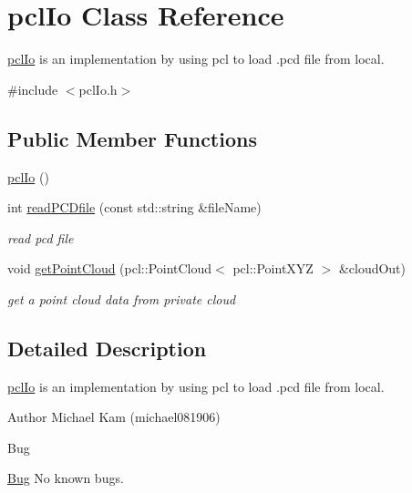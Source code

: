 \hypertarget{classpclIo}{}\section{pcl\+Io Class Reference}
\label{classpclIo}


\hyperlink{classpclIo}{pcl\+Io} is an implementation by using pcl to load .pcd file from local.
\begin{DoxyItemize}
\item 
\end{DoxyItemize} 




{\ttfamily \#include $<$pcl\+Io.\+h$>$}

\subsection*{Public Member Functions}
\begin{DoxyCompactItemize}
\item 
\hyperlink{classpclIo_afa4cdfe63ff1b142d15e2926afdb1e4b}{pcl\+Io} ()
\item 
int \hyperlink{classpclIo_a37ade0d99bf4ce043df990a605608ed4}{read\+P\+C\+Dfile} (const std\+::string \&file\+Name)
\begin{DoxyCompactList}\small\item\em read pcd file \end{DoxyCompactList}\item 
void \hyperlink{classpclIo_a6dda8313faa0a9647d56836f01666504}{get\+Point\+Cloud} (pcl\+::\+Point\+Cloud$<$ pcl\+::\+Point\+X\+YZ $>$ \&cloud\+Out)
\begin{DoxyCompactList}\small\item\em get a point cloud data from private cloud \end{DoxyCompactList}\end{DoxyCompactItemize}


\subsection{Detailed Description}
\hyperlink{classpclIo}{pcl\+Io} is an implementation by using pcl to load .pcd file from local.
\begin{DoxyItemize}
\item 
\end{DoxyItemize}

\begin{DoxyAuthor}{Author}
Michael Kam (michael081906) 
\end{DoxyAuthor}
\begin{DoxyRefDesc}{Bug}
\item[\hyperlink{bug__bug000014}{Bug}]No known bugs. \end{DoxyRefDesc}


